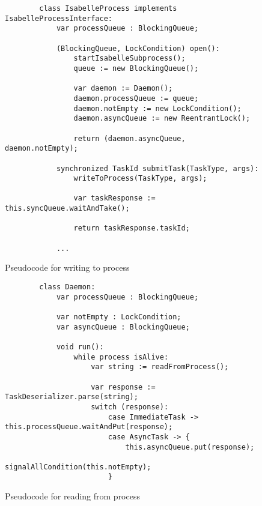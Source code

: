 \begin{figure}[!htb]
    \begin{lstlisting}
        class IsabelleProcess implements IsabelleProcessInterface:
            var processQueue : BlockingQueue;

            (BlockingQueue, LockCondition) open():
                startIsabelleSubprocess();
                queue := new BlockingQueue();

                var daemon := Daemon();
                daemon.processQueue := queue;
                daemon.notEmpty := new LockCondition();
                daemon.asyncQueue := new ReentrantLock();

                return (daemon.asyncQueue, daemon.notEmpty);
            
            synchronized TaskId submitTask(TaskType, args):
                writeToProcess(TaskType, args);
                
                var taskResponse := this.syncQueue.waitAndTake();

                return taskResponse.taskId;
            
            ...
    \end{lstlisting}

    \caption{Pseudocode for writing to process}
    \label{fig:IsabelleProcess}
\end{figure}

\begin{figure}[!htb]
    \begin{lstlisting}
        class Daemon:
            var processQueue : BlockingQueue;
            
            var notEmpty : LockCondition;
            var asyncQueue : BlockingQueue;
            
            void run():
                while process isAlive:
                    var string := readFromProcess();

                    var response := TaskDeserializer.parse(string);
                    switch (response):
                        case ImmediateTask -> this.processQueue.waitAndPut(response);
                        case AsyncTask -> {
                            this.asyncQueue.put(response);
                            signalAllCondition(this.notEmpty);
                        }
    \end{lstlisting}

    \caption{Pseudocode for reading from process}
    \label{fig:IsabelleDaemon}
\end{figure}

